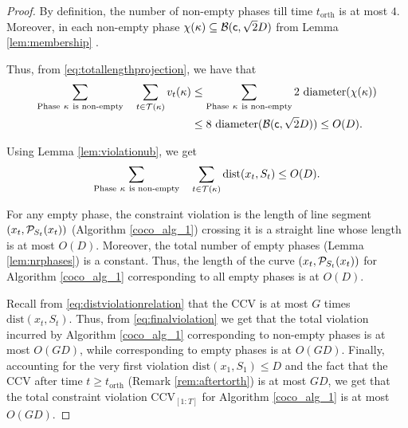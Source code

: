 \begin{proof}
 

By definition, the number of non-empty phases till time $t_{\text{orth}}$ is at most $4$. Moreover, in each non-empty phase $\chi(\kappa) \subseteq \mathcal{B}({\mathsf{c}}, \sqrt{2}D)$ from Lemma \ref{lem:membership} . 

Thus, from  \eqref{eq:totallengthprojection}, we have that \begin{align}\nonumber
\sum_{\text{Phase} \ \kappa \ \text{is non-empty}} \ \ \ \sum_{t\in \mathcal{T}(\kappa)} v_t(\kappa) &\le \sum_{\text{Phase} \ \kappa \ \text{is non-empty}} 2\ \text{diameter}(\chi(\kappa)) \\ \label{eq:summeanwidth}
&\le 8 \ \text{diameter}(\mathcal{B}({\mathsf{c}}, \sqrt{2}D))\le O(D).
\end{align}

Using Lemma \ref{lem:violationub}, we get 
\begin{align}\label{eq:finalviolation}
\sum_{\text{Phase} \ \kappa \ \text{is non-empty}} \ \ \ \sum_{t\in \mathcal{T}(\kappa)}\text{dist}(x_t, S_t) \le O(D).
\end{align}

For any empty phase, the constraint violation is the length of line segment $(x_t,\mathcal{P}_{S_t}(x_{t}))$ (Algorithm \ref{coco_alg_1}) crossing it is a straight line whose length is at most $O(D)$. 
 Moreover, the total number of empty phases (Lemma \ref{lem:nrphases}) is a constant.
 Thus, the length of the curve $(x_t,\mathcal{P}_{S_t}(x_{t}))$ for Algorithm \ref{coco_alg_1} corresponding to all empty phases is at $O(D)$.
%
%

Recall from \eqref{eq:distviolationrelation} that the CCV is at most $G$ times $\text{dist}(x_t, S_t)$.
Thus, from \eqref{eq:finalviolation} we get that the total violation incurred by Algorithm \ref{coco_alg_1} corresponding to non-empty phases is at most $O(GD)$, while corresponding to empty phases is at $O(GD)$.
Finally, accounting for the very first violation $\text{dist}(x_1, S_1)\le D$ and the fact that the CCV after time $t\ge t_{\text{orth}}$ (Remark \ref{rem:aftertorth}) is at most $GD$, we get that the total constraint violation $\text{CCV}_{[1:T]}$ for Algorithm \ref{coco_alg_1} is at most $O(G D)$. 

\end{proof}